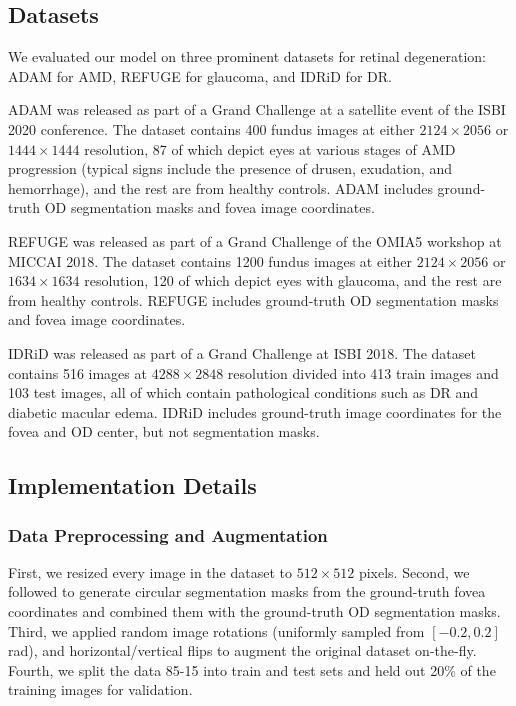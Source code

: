 \documentclass[hidelinks,runningheads]{llncs}
\begin{document}
\subsection{Datasets}

We evaluated our model on three prominent datasets for retinal degeneration: ADAM \cite{fu_adam_2020} for \ac{AMD}, REFUGE \cite{ORLANDO2020101570} for glaucoma, and IDRiD \cite{PORWAL2020101561} for \ac{DR}.


ADAM was released as part of a Grand Challenge at a satellite event of the ISBI 2020 conference.
The dataset contains 400 fundus images at either $2124 \times 2056$ or $1444 \times 1444$ resolution, 87 of which depict eyes at various stages of \ac{AMD} progression (typical signs include the presence of drusen, exudation, and hemorrhage), and the rest are from healthy controls.
ADAM includes ground-truth \ac{OD} segmentation masks and fovea image coordinates.

REFUGE was released as part of a Grand Challenge of the OMIA5 workshop at MICCAI 2018. The dataset contains 1200 fundus images at either $2124 \times 2056$ or $1634 \times 1634$  resolution, 120 of which depict eyes with glaucoma, and the rest are from healthy controls.
REFUGE includes ground-truth \ac{OD} segmentation masks and fovea image coordinates.

IDRiD was released as part of a Grand Challenge at ISBI 2018.
The dataset contains 516 images at $4288 \times 2848$ resolution divided into 413 train images and 103 test images, all of which contain pathological conditions such as \ac{DR} and diabetic macular edema.
IDRiD includes ground-truth image coordinates for the fovea and \ac{OD} center, but not segmentation masks.




\subsection{Implementation Details}

\subsubsection{Data Preprocessing and Augmentation}
First, we resized every image in the dataset to $512 \times 512$ pixels.
Second, we followed \cite{kamble_optic_2020} to generate circular segmentation masks from the ground-truth fovea coordinates and combined them with the ground-truth \ac{OD} segmentation masks.
Third, we applied random image rotations (uniformly sampled from $[-0.2, 0.2]$ rad), and horizontal/vertical flips to augment the original dataset on-the-fly. Fourth, we split the data 85-15 into train and test sets and held out 20\% of the training images for validation.
\end{document}
